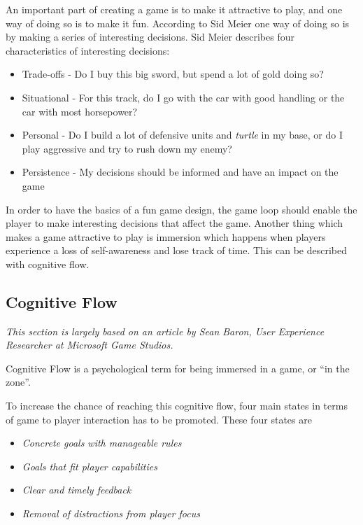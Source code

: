 An important part of creating a game is to make it attractive to play, and one way of doing so is to make it fun.
According to Sid Meier\cite{GDC2012} one way of doing so is by making a series of interesting decisions.
Sid Meier describes four characteristics of interesting decisions:\cite{GDC2012}
\begin{itemize}
	\item Trade-offs - Do I buy this big sword, but spend a lot of gold doing so?
	\item Situational - For this track, do I go with the car with good handling or the car with most horsepower?
	\item Personal - Do I build a lot of defensive units and \textit{turtle} in my base, or do I play aggressive and try to rush down my enemy?
	\item Persistence - My decisions should be informed and have an impact on the game
\end{itemize}

In order to have the basics of a fun game design, the game loop should enable the player to make interesting decisions that affect the game.
Another thing which makes a game attractive to play is immersion which happens when players experience a loss of self-awareness and lose track of time.
This can be described with cognitive flow.

\subsection{Cognitive Flow}\label{makingthegamefun:cognitiveflow}
\emph{This section is largely based on an article by Sean Baron, User Experience Researcher at Microsoft Game
Studios\cite{baron}.}

Cognitive Flow is a psychological term for being immersed in a game, or ``in the zone''.

To increase the chance of reaching this cognitive flow, four main states in terms of game to player interaction has to
be promoted.  
These four states are 
\begin{itemize}
    \item \emph{Concrete goals with manageable rules}
    \item \emph{Goals that fit player capabilities}
    \item \emph{Clear and timely feedback}
    \item \emph{Removal of distractions from player focus}
\end{itemize}


